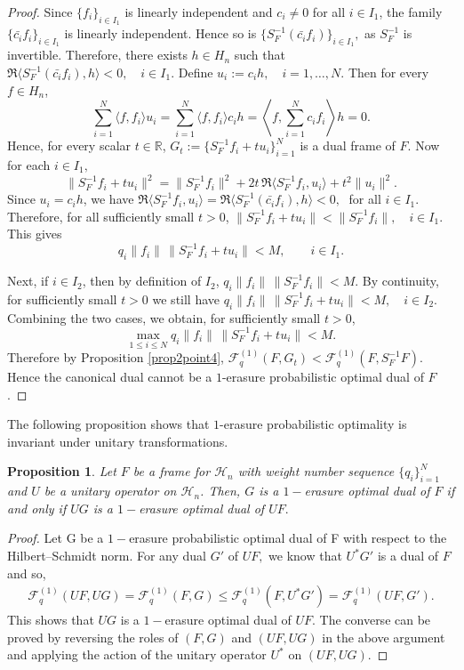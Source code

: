 \documentclass[final,1p,times]{elsarticle}
\newtheorem{prop}[thm]{Proposition}
\begin{document}
\begin{proof}
Since $\{f_i\}_{i\in I_1}$ is linearly independent and $c_i\neq 0$ for all $i\in I_1$, the family $\{\bar{c_i} f_i\}_{i\in I_1}$ is linearly independent. Hence so is $\{S_F^{-1}(\bar{c_i} f_i)\}_{i\in I_1},$ as $S_F^{-1}$ is invertible. Therefore, there exists $h\in H_n$ such that $ \Re\langle S_F^{-1}(\bar{c_i} f_i),h\rangle<0,
\quad i\in I_1.$ Define $u_i:=c_i h,\quad i=1,\dots,N.$ Then for every $f\in H_n$,
\[
\sum_{i=1}^N \langle f,f_i\rangle u_i
=
\sum_{i=1}^N \langle f,f_i\rangle c_i h
=
\left\langle f,\sum_{i=1}^N c_i f_i\right\rangle h
=0.
\]
Hence, for every scalar $t\in\mathbb{R}$, $G_t:=\{S_F^{-1}f_i+t u_i\}_{i=1}^N$
is a dual frame of $F$.  Now for each $i\in I_1,$
\[
\|S_F^{-1}f_i+t u_i\|^2
=
\|S_F^{-1}f_i\|^2
+2t\,\Re\langle S_F^{-1}f_i,u_i\rangle
+t^2\|u_i\|^2.
\]
Since $u_i=c_i h$, we have $\Re\langle S_F^{-1}f_i,u_i\rangle = \Re\langle S_F^{-1}(\bar{c_i} f_i),h\rangle<0,\;$ for all $i \in I_1.$ Therefore, for all sufficiently small $t>0$, $\|S_F^{-1}f_i+t u_i\|<\|S_F^{-1}f_i\|,
\quad i\in I_1.$ This gives
\[
q_i\|f_i\|\,\|S_F^{-1}f_i+t u_i\|<M,
\qquad i\in I_1.
\]

Next, if $i\in I_2$, then by definition of $I_2$,
\(
q_i\|f_i\|\,\|S_F^{-1}f_i\|<M.
\)
By continuity, for sufficiently small $t>0$ we still have
\(
q_i\|f_i\|\,\|S_F^{-1}f_i+t u_i\|<M,
\quad i\in I_2.
\)
Combining the two cases, we obtain, for sufficiently small $t>0$,
\[
\max_{1\le i\le N} q_i\|f_i\|\,\|S_F^{-1}f_i+t u_i\|<M.
\]
Therefore by Proposition \ref{prop2point4},
\(
\mathcal{F}_q^{(1)}(F,G_t)< \mathcal{F}_q^{(1)}(F,S_F^{-1}F).
\)
Hence the canonical dual cannot be a $1$-erasure probabilistic optimal dual of $F$.
\end{proof}


The following proposition shows that $1$-erasure probabilistic optimality is invariant under unitary transformations. 


\begin{prop}\label{thm4point3}
Let $F$ be a frame for $\mathcal{H}_n$ with weight number sequence $\{q_i\}_{i=1}^N$   and  $U$ be a unitary operator on $\mathcal{H}_n$. Then, $G$ is a $1-$erasure  optimal dual of $F$  if and only if $UG$  is a $1-$erasure  optimal dual of $UF.$
\end{prop}
			\begin{proof}
			Let G be a $1-$erasure probabilistic optimal dual of F with respect to the Hilbert–Schmidt norm. For any dual $G'$ of $UF,$ we know that $U^{*}G'$ is a dual of $F$ and so,
			\begin{align*}
				\mathcal{F}_{q}^{(1)} (UF,UG) = \mathcal{F}_{q}^{(1)} (F,G)  \leq \mathcal{F}_{q}^{(1)} (F, U^{*}G') = \mathcal{F}_{q}^{(1)} (UF,G').
			\end{align*}
			This shows that $UG $ is a $1-$erasure optimal dual of $UF.$  The converse can be proved by reversing the roles of $(F,G)$ and $(UF,UG)$ in the above argument and applying the action of the unitary operator $U^*$ on $(UF,UG)$.
		\end{proof}
		
\end{document}

